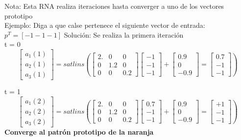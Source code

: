 \documentclass{article}
\begin{document}
Nota: Esta RNA realiza iteraciones hasta converger a uno de los vectores prototipo\\
Ejemplo: Diga a que calse pertenece el siguiente vector de entrada: $p^T = [-1 -1 -1]$
Solución: Se realiza la primera iteración\\
t = 0\\
\[
\begin{bmatrix}
a_1(1)\\
a_2(1)\\
a_3(1)
\end{bmatrix}
= satlins( 
\begin{bmatrix}
2. &  0& 0\\
0 &  1.2& 0\\
0 &  0& 0.2
\end{bmatrix}
\begin{bmatrix}
-1\\
-1\\
-1
\end{bmatrix}
+
\begin{bmatrix}
0.9\\
0\\
-0.9
\end{bmatrix}
=
\begin{bmatrix}
0.7\\
-1\\
-1
\end{bmatrix}
)
\]

t = 1\\
\[
\begin{bmatrix}
a_1(2)\\
a_2(2)\\
a_3(2)
\end{bmatrix}
= satlins( 
\begin{bmatrix}
2. &  0& 0\\
0 &  1.2& 0\\
0 &  0& 0.2
\end{bmatrix}
\begin{bmatrix}
0.7\\
-1\\
-1
\end{bmatrix}
+
\begin{bmatrix}
0.9\\
0\\
-0.9
\end{bmatrix}
=
\begin{bmatrix}
+1\\
-1\\
-1
\end{bmatrix}
)
\]
\textbf{Converge al patrón prototipo de la naranja}
\end{document}
